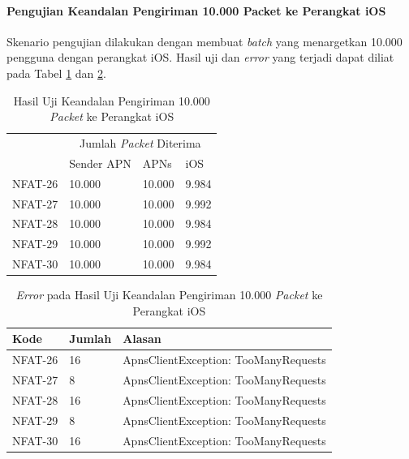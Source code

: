 \paragraph{Pengujian Keandalan Pengiriman 10.000 Packet ke Perangkat iOS}
\par Skenario pengujian dilakukan dengan membuat \textit{batch} yang menargetkan 10.000 pengguna dengan perangkat iOS. Hasil uji dan \textit{error} yang terjadi dapat diliat pada Tabel \ref{t:keandalan-ios-10k} dan \ref{t:error-keandalan-ios-10k}.
\begin{longtable}{|p{1.5cm}|p{2cm}|p{2cm}|p{2cm}|}
	\caption{Hasil Uji Keandalan Pengiriman 10.000 \textit{Packet} ke Perangkat iOS} \label{t:keandalan-ios-10k} \\ \hline
	\rowcolor{lightgray} & \multicolumn{3}{c|}{Jumlah \textit{Packet} Diterima} \\ \hhline{~|*3{-}|}
	\rowcolor{lightgray} \multirow{-2}{*}{Kode} & Sender APN & APNs & iOS \\ \hline
	\endhead
	NFAT-26 & 10.000 & 10.000 & 9.984 \\ \hline
	NFAT-27 & 10.000 & 10.000 & 9.992 \\ \hline
	NFAT-28 & 10.000 & 10.000 & 9.984 \\ \hline
	NFAT-29 & 10.000 & 10.000 & 9.992 \\ \hline
	NFAT-30 & 10.000 & 10.000 & 9.984 \\ \hline
\end{longtable}
\begin{longtable}{|p{1.5cm}|p{1.5cm}|p{4cm}|}
	\caption{\textit{Error} pada Hasil Uji Keandalan Pengiriman 10.000 \textit{Packet} ke Perangkat iOS} \label{t:error-keandalan-ios-10k} \\ \hline
	\rowcolor{lightgray} Kode & Jumlah & Alasan \\ \hline
	\endhead
	NFAT-26 & 16 & ApnsClientException: TooManyRequests \\ \hline
	NFAT-27 & 8 & ApnsClientException: TooManyRequests \\ \hline
	NFAT-28 & 16 & ApnsClientException: TooManyRequests \\ \hline
	NFAT-29 & 8 & ApnsClientException: TooManyRequests \\ \hline
	NFAT-30 & 16 & ApnsClientException: TooManyRequests \\ \hline
\end{longtable}

